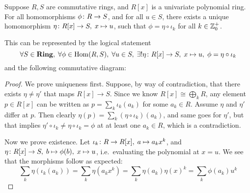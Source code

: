 \begin{theorem}\label{thm:univ-prop-polynomial}
    Suppose \(R,S\) are commutative rings,
    and \(R[x]\) is a univariate polynomial ring.
    For all homomorphisms \(\phi\colon R\to S\),
    and for all \(u \in S\),
    there exists a unique homomorphism \(\eta\colon R[x]\to S,\;x\mapsto u\),
    such that \(\phi = \eta\circ\iota_k\) for all \(k \in \mathbb{Z}_0^+\).

    This can be represented by the logical statement
    \begin{equation*}
        \forall S \in \mathbf{Ring},\;\forall \phi \in \operatorname{Hom}(R,S),\;
        \forall u \in S,\;\exists!\eta\colon R[x]\to S,\;x\mapsto u,\;
        \phi = \eta\circ\iota_k
    \end{equation*}
    and the following commutative diagram:
    \begin{center}
    \end{center}
\end{theorem}
\begin{proof}
    We prove uniqueness first.
    Suppose, by way of contradiction,
    that there exists \(\eta \neq \eta'\) that maps \(R[x] \to S\).
    Since we know \(R[x] \cong \bigoplus_k R\),
    any element \(p \in R[x]\) can be written as \(p = \sum_k \iota_k(a_k)\)
    for some \(a_k \in R\).
    Assume \(\eta\) and \(\eta'\) differ at \(p\).
    Then clearly \(\eta(p) = \sum_k (\eta\circ\iota_k)(a_k)\),
    and same goes for \(\eta'\),
    but that implies \(\eta'\circ\iota_k \neq \eta\circ\iota_k = \phi\)
    at at least one \(a_k \in R\),
    which is a contradiction.

    Now we prove existence.
    Let \(\iota_k\colon R\to R[x],\;a\mapsto a_k x^k\),
    and \(\eta\colon R[x]\to S,\;b\mapsto\phi(b),\; x \mapsto u\),
    i.e.\ evaluating the polynomial at \(x = u\).
    We see that the morphisms follow as expected:
    \begin{equation*}
        \sum_k \eta(\iota_k(a_k)) = \sum_k \eta(a_k x^k)
        = \sum_k \eta(a_k){\eta(x)}^k = \sum_k \phi(a_k)u^k
    \end{equation*}
\end{proof}


